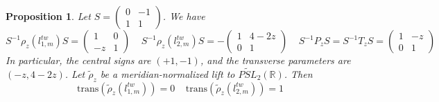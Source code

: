 \documentclass{article}
\theoremstyle{plain}
\theoremstyle{definition}
\theoremstyle{plain}
\newtheorem{prop}[theorem]{Proposition}
\theoremstyle{plain}
\theoremstyle{plain}
\theoremstyle{remark}
\theoremstyle{remark}
\theoremstyle{plain}
\theoremstyle{plain}
\theoremstyle{plain}
\theoremstyle{plain}
\begin{document}
\begin{prop}\label{prop:twist-height}
Let $S = \left(\begin{smallmatrix}0&-1\\1&1\end{smallmatrix}\right)$. We have
\begin{equation*}
	S^{-1}\rho_z(l_{1,m}^{tw})S = \begin{pmatrix}1 & 0 \\ -z & 1\end{pmatrix} \ \ \ \ \ S^{-1}\rho_z(l_{2,m}^{tw})S = -\begin{pmatrix}1&4-2z\\0&1\end{pmatrix} \ \ \ \ \ S^{-1}P_zS = S^{-1}T_zS = \begin{pmatrix}1 & -z \\ 0 & 1\end{pmatrix}
\end{equation*}
In particular, the central signs are $(+1, -1)$, and the transverse parameters are $(-z, 4-2z)$. Let $\widetilde\rho_z$ be a meridian-normalized lift to $\widetilde{PSL}_2(\mathbb R)$. Then
\begin{equation*}
	\mathrm{trans}(\widetilde\rho_z(l_{1,m}^{tw})) = 0 \ \ \ \ \ \mathrm{trans}(\widetilde\rho_z(l_{2,m}^{tw})) = 1
\end{equation*}
\end{prop}
\end{document}
